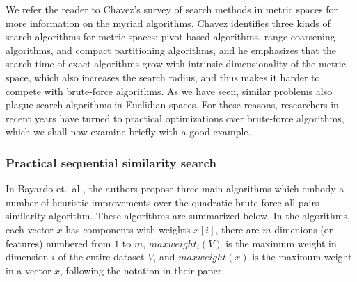 \documentclass{comjnl}
\begin{document}
We refer the reader to Chavez's survey of search methods in metric
spaces \cite{Chavez:2001} for more information on the myriad
algorithms. Chavez identifies three kinds of search algorithms for
metric spaces: pivot-based algorithms, range coarsening algorithms,
and compact partitioning algorithms, and he emphasizes that the search
time of exact algorithms grow with intrinsic dimensionality of the
metric space, which also increases the search radius, and thus makes
it harder to compete with brute-force algorithms. As we have seen,
similar problems also plague search algorithms in Euclidian spaces.
For these reasons, researchers in recent years have turned to
practical optimizations over brute-force algorithms, which we shall
now examine briefly with a good example.

\subsubsection{Practical sequential similarity search}
\label{sec:practicalseq}

In Bayardo et.~al \cite{Bayardo2007Scaling}, the authors propose three
main algorithms which embody a number of heuristic improvements over
the quadratic brute force all-pairs similarity algorithm. 
These algorithms are summarized below. In
the algorithms, each vector $x$ has components with weights $x[i]$,
there are $m$ dimenions (or features) numbered from $1$ to $m$,
$maxweight_i(V)$ is the maximum weight in dimension $i$ of the entire
dataset $V$, and $maxweight(x)$ is the maximum weight in a vector $x$,
following the notation in their paper.
\end{document}
